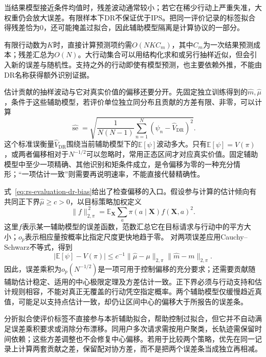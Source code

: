 当结果模型接近条件均值时，残差波动通常较小；若它在稀少行动上严重失准，大权重仍会放大误差。有限样本下DR不保证优于IPS。把同一评价记录的标签拟合得残差恰为0，还可能掩盖过拟合，因此辅助模型隔离是计算协议的一部分。

有限行动数为$K$时，直接计算预测项约需$O(NK C_m)$，其中$C_m$为一次结果预测成本；残差汇总为$O(N)$。大行动集合可以用结构化求和或另行抽样近似，但会引入新的误差与随机性。支持之外的行动即使有模型预测，也主要依赖外推，不能由DR名称获得额外识别证据。

估计贡献的抽样波动与它对真实价值的偏移还要分开。先固定独立训练得到的$\widehat m,\widehat\mu$，条件于这些辅助模型，若评价单位独立同分布且贡献的方差有限、非零，可以计算
\begin{equation}
 \widehat{\operatorname{se}}
  =\sqrt{\frac{1}{N(N-1)}
       \sum_{n=1}^{N}(\psi_n-\widehat V_{\mathrm{DR}})^2}.
 \label{eq:rs-evaluation-dr-se}
\end{equation}
这个标准误衡量$\widehat V_{\mathrm{DR}}$围绕当前辅助模型下的$\mathbb E[\psi]$波动多大。只有$\mathbb E[\psi]=V(\pi)$，或两者偏移相对于$N^{-1/2}$可以忽略时，常用正态区间才对应真实价值。固定辅助模型中至少一项精确、其他识别和矩条件成立，是令偏移为零的一种充分情形；“一项估计一致”则需要再说明速率，不能直接代替精确性。

式~\eqref{eq:rs-evaluation-dr-bias}给出了检查偏移的入口。假设参与计算的估计倾向有共同正下界$\widehat\mu\geq c>0$，以目标策略加权定义
\[
 \|f\|_{2,\pi}^{\,2}
  =\mathbb E_{\bm X}\sum_a\pi(a\mid\bm X)f(\bm X,a)^2.
\]
这里$f$表示某一辅助模型的误差函数，范数汇总它在目标请求与行动中的平方大小；$o_p$表示相应量按概率比指定尺度更快地趋于零。
对两项误差应用Cauchy--Schwarz不等式，得到
\begin{equation}
 |\mathbb E[\psi]-V(\pi)|
 \leq c^{-1}\|\widehat\mu-\mu\|_{2,\pi}
                \|\widehat m-m\|_{2,\pi}.
 \label{eq:rs-evaluation-dr-drift-bound}
\end{equation}
因此，误差乘积为$o_p(N^{-1/2})$是一项可用于控制偏移的充分要求；还需要贡献随辅助估计稳定、适用的中心极限定理及方差估计一致。正下界必须与行动支持和估计规则相容，不能对真正无覆盖的行动凭空指定概率。两个辅助模型仅缓慢趋近真值，可能足以支持点估计一致，却仍让区间中心的偏移大于所报告的误差条。

分折拟合使评价标签不直接参与本折辅助拟合，帮助控制过拟合，但它并不自动满足误差乘积要求或消除分布漂移。同用户多次请求需按用户聚类，长轨迹需保留时间依赖；这些方差调整也不会修复中心偏移。若用于比较两个策略，优先在同一记录上计算两套贡献之差，保留配对协方差，而不是把两个误差条当成独立再相减。

